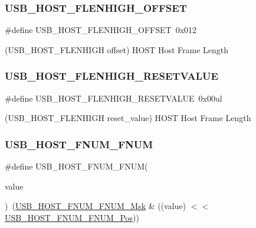 \subsubsection{\texorpdfstring{USB\_HOST\_FLENHIGH\_OFFSET}{USB\_HOST\_FLENHIGH\_OFFSET}}
{\footnotesize\ttfamily \#define U\+S\+B\+\_\+\+H\+O\+S\+T\+\_\+\+F\+L\+E\+N\+H\+I\+G\+H\+\_\+\+O\+F\+F\+S\+ET~0x012}



(U\+S\+B\+\_\+\+H\+O\+S\+T\+\_\+\+F\+L\+E\+N\+H\+I\+GH offset) H\+O\+ST Host Frame Length 

\mbox{\label{group___s_a_m_d21___u_s_b_ga0a62c5665d87352977c007e02be7b860}} 
\subsubsection{\texorpdfstring{USB\_HOST\_FLENHIGH\_RESETVALUE}{USB\_HOST\_FLENHIGH\_RESETVALUE}}
{\footnotesize\ttfamily \#define U\+S\+B\+\_\+\+H\+O\+S\+T\+\_\+\+F\+L\+E\+N\+H\+I\+G\+H\+\_\+\+R\+E\+S\+E\+T\+V\+A\+L\+UE~0x00ul}



(U\+S\+B\+\_\+\+H\+O\+S\+T\+\_\+\+F\+L\+E\+N\+H\+I\+GH reset\+\_\+value) H\+O\+ST Host Frame Length 

\mbox{\label{group___s_a_m_d21___u_s_b_gafa327196ffc23c58fc29f14560694af5}} 
\subsubsection{\texorpdfstring{USB\_HOST\_FNUM\_FNUM}{USB\_HOST\_FNUM\_FNUM}}
{\footnotesize\ttfamily \#define U\+S\+B\+\_\+\+H\+O\+S\+T\+\_\+\+F\+N\+U\+M\+\_\+\+F\+N\+UM(\begin{DoxyParamCaption}\item[{}]{value }\end{DoxyParamCaption})~(\mbox{\hyperlink{group___s_a_m_d21___u_s_b_gaeba1cea267102daedd3d1d3ca046230a}{U\+S\+B\+\_\+\+H\+O\+S\+T\+\_\+\+F\+N\+U\+M\+\_\+\+F\+N\+U\+M\+\_\+\+Msk}} \& ((value) $<$$<$ \mbox{\hyperlink{group___s_a_m_d21___u_s_b_ga7fccb7a92df0639adc1b73dad6e17d87}{U\+S\+B\+\_\+\+H\+O\+S\+T\+\_\+\+F\+N\+U\+M\+\_\+\+F\+N\+U\+M\+\_\+\+Pos}}))}

